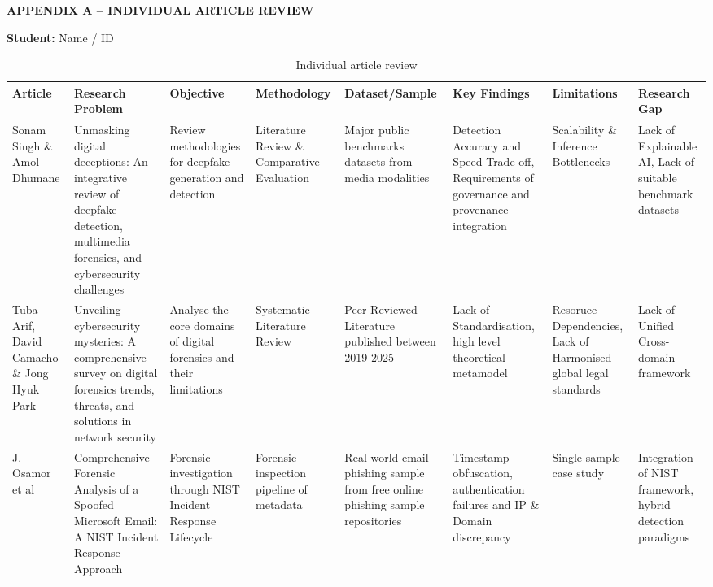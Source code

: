 \documentclass[12pt,a4paper]{article}
\begin{document}
\newpage
\begin{landscape}
\begin{flushleft}
    {\fontsize{14pt}{17pt}\selectfont
    \textbf{APPENDIX A -- INDIVIDUAL ARTICLE REVIEW}}
\end{flushleft}

\vspace{0.3cm}

\textbf{Student:} Name / ID
\begin{table}[H]
\caption{Individual article review}
\label{tab:individual-article-review}
\vspace{-0.2cm}
\fontsize{7.5pt}{9.5pt}\selectfont
\renewcommand{\arraystretch}{1.1}

\begin{tabularx}{\linewidth}{|>{\raggedright\arraybackslash}p{2.2cm}|>{\raggedright\arraybackslash}X|>{\raggedright\arraybackslash}X|>{\raggedright\arraybackslash}X|>{\raggedright\arraybackslash}X|>{\raggedright\arraybackslash}X|>{\raggedright\arraybackslash}X|>{\raggedright\arraybackslash}X|}
\hline

\textbf{Article} &
\textbf{Research Problem} &
\textbf{Objective} &
\textbf{Methodology} &
\textbf{Dataset/Sample} &
\textbf{Key Findings} &
\textbf{Limitations} &
\textbf{Research Gap}
\tabularnewline
\hline

Sonam Singh \& Amol Dhumane & 
Unmasking digital deceptions: An integrative review of deepfake detection, multimedia forensics, and cybersecurity challenges & 
Review methodologies for deepfake generation and detection & 
Literature Review \& Comparative Evaluation & 
Major public benchmarks datasets from media modalities & 
Detection Accuracy and Speed Trade-off, Requirements of governance and provenance integration&
Scalability \& Inference Bottlenecks & 
Lack of Explainable AI, Lack of suitable benchmark datasets 
\tabularnewline
\hline
Tuba Arif, David Camacho \& Jong Hyuk Park & 
Unveiling cybersecurity mysteries: A comprehensive survey on digital forensics trends, threats, and solutions in network security & 
Analyse the core domains of digital forensics and their limitations&
Systematic Literature Review & 
Peer Reviewed Literature published between 2019-2025 & 
Lack of Standardisation, high level theoretical metamodel & 
Resoruce Dependencies, Lack of Harmonised global legal standards & 
Lack of Unified Cross-domain framework
\tabularnewline
\hline
J. Osamor et al &
Comprehensive Forensic Analysis of a Spoofed Microsoft Email: A NIST Incident Response Approach & 
Forensic investigation through NIST Incident Response Lifecycle & 
Forensic inspection pipeline of metadata & 
Real-world email phishing sample from free online phishing sample repositories & 
Timestamp obfuscation, authentication failures and IP \& Domain discrepancy & 
Single sample case study & 
Integration of NIST framework, hybrid detection paradigms   
\tabularnewline
\hline

\end{tabularx}
\end{table}
\end{landscape}
\end{document}
